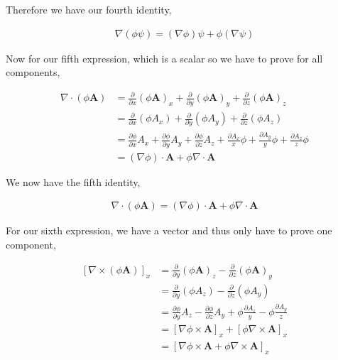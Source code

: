 \documentclass[11pt]{amsart}
\begin{document}
Therefore we have our fourth identity,

\begin{align*}
  \nabla(\phi\psi) = (\nabla\phi)\psi + \phi(\nabla\psi)
\end{align*}

Now for our fifth expression, which is a scalar so we have to prove for all components,

\begin{align*}
  \nabla\cdot(\phi\mathbf{A}) &= \frac{\partial}{\partial x}{(\phi\mathbf{A})}_x + \frac{\partial}{\partial y}{(\phi\mathbf{A})}_y + \frac{\partial}{\partial z}{(\phi\mathbf{A})}_z \\
                              &= \frac{\partial}{\partial x}(\phi A_x) + \frac{\partial}{\partial y}(\phi A_y) + \frac{\partial}{\partial z}(\phi A_z) \\
                              &= \frac{\partial\phi}{\partial x} A_x + \frac{\partial\phi}{\partial y} A_y + \frac{\partial\phi}{\partial z} A_z + \frac{\partial A_x}{x} \phi + \frac{\partial A_y}{y} \phi + \frac{\partial A_z}{z} \phi \\
                              &= (\nabla\phi)\cdot\mathbf{A} + \phi \nabla\cdot\mathbf{A}
\end{align*}

We now have the fifth identity,

\begin{align*}
  \nabla\cdot(\phi\mathbf{A}) = (\nabla\phi)\cdot\mathbf{A} + \phi \nabla\cdot\mathbf{A}
\end{align*}

For our sixth expression, we have a vector and thus only have to prove one component,

\begin{align*}
  {[\nabla\times(\phi\mathbf{A})]}_x &= \frac{\partial}{\partial y}{(\phi\mathbf{A})}_z - \frac{\partial}{\partial z}{(\phi\mathbf{A})}_y \\
                                     &= \frac{\partial}{\partial y}(\phi A_z) - \frac{\partial}{\partial z}(\phi A_y) \\
                                     &= \frac{\partial\phi}{\partial y}A_z - \frac{\partial\phi}{\partial z}A_y + \phi\frac{\partial A_z}{y} - \phi\frac{\partial A_y}{z} \\
                                     &= {[\nabla\phi\times\mathbf{A}]}_x + {[\phi\nabla\times\mathbf{A}]}_x \\
                                     &= {[\nabla\phi\times\mathbf{A} + \phi\nabla\times\mathbf{A}]}_x
\end{align*}
\end{document}
